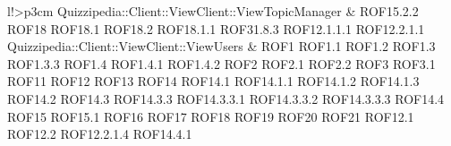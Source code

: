 \begin{tabella}{l!{\VRule}>{\centering\arraybackslash}p{3cm}}
Quizzipedia::Client::ViewClient::ViewTopicManager & ROF15.2.2 \linebreak ROF18 \linebreak ROF18.1 \linebreak ROF18.2 \linebreak ROF18.1.1 \linebreak ROF31.8.3 \linebreak ROF12.1.1.1 \linebreak ROF12.2.1.1 \\
Quizzipedia::Client::ViewClient::ViewUsers & ROF1 \linebreak ROF1.1 \linebreak ROF1.2 \linebreak ROF1.3 \linebreak ROF1.3.3 \linebreak ROF1.4 \linebreak ROF1.4.1 \linebreak ROF1.4.2 \linebreak ROF2 \linebreak ROF2.1 \linebreak ROF2.2 \linebreak ROF3 \linebreak ROF3.1 \linebreak ROF11 \linebreak ROF12 \linebreak ROF13 \linebreak ROF14 \linebreak ROF14.1 \linebreak ROF14.1.1 \linebreak ROF14.1.2 \linebreak ROF14.1.3 \linebreak ROF14.2 \linebreak ROF14.3 \linebreak ROF14.3.3 \linebreak ROF14.3.3.1 \linebreak ROF14.3.3.2 \linebreak ROF14.3.3.3 \linebreak ROF14.4 \linebreak ROF15 \linebreak ROF15.1 \linebreak ROF16 \linebreak ROF17 \linebreak ROF18 \linebreak ROF19 \linebreak ROF20 \linebreak ROF21 \linebreak ROF12.1 \linebreak ROF12.2 \linebreak ROF12.2.1.4 \linebreak ROF14.4.1 \\

\end{tabella}

